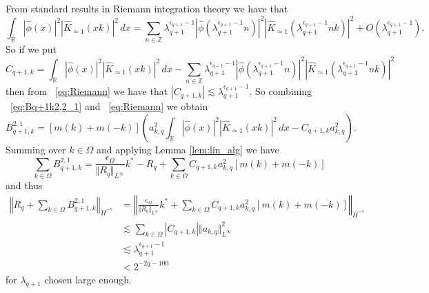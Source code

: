 \documentclass[12pt,reqno,letterpaper]{amsart}
\numberwithin{equation}{section}
\newcommand{\1}{{\bf 1}}
\newcommand{\2}{{\bf 2}}
\newcommand{\R}{\mathbb R}
\newcommand{\Z}{\mathbb Z}
\theoremstyle{remark}
\theoremstyle{remark}
\begin{document}
From standard results in Riemann integration theory we have that
\begin{equation}\label{eq:Riemann}
    \int_{\R} |\hat{\phi}(x)|^2 \left|\hat{K}_{\simeq 1}\left(xk\right)\right|^2\, dx = \sum_{n \in \Z} \lambda_{q+1}^{\epsilon_{q+1}-1} \left|\hat{\phi}\left(\lambda_{q+1}^{\epsilon_{q+1}-1}n\right)\right|^2 \left|\hat{K}_{\simeq 1}\left(\lambda_{q+1}^{\epsilon_{q+1}-1}nk\right)\right|^2 + O\left(\lambda_{q+1}^{\epsilon_{q+1}-1}\right).
\end{equation}
So if we put
$$
C_{q+1,k} = \int_{\R} |\hat{\phi}(x)|^2 \left|\hat{K}_{\simeq 1}\left(xk\right)\right|^2\, dx - \sum_{n \in \Z} \lambda_{q+1}^{\epsilon_{q+1}-1} \left|\hat{\phi}\left(\lambda_{q+1}^{\epsilon_{q+1}-1}n\right)\right|^2 \left|\hat{K}_{\simeq 1}\left(\lambda_{q+1}^{\epsilon_{q+1}-1}nk\right)\right|^2
$$
then from ~\eqref{eq:Riemann} we have that $|C_{q+1,k}| \lesssim \lambda_{q+1}^{\epsilon_{q+1}-1}$. So combining ~\eqref{eq:Bq+1k2,2_1} and ~\eqref{eq:Riemann} we obtain
\begin{equation*}
    B_{q+1,k}^{2,1} = \left[m(k) + m(-k)\right]\left(a_{k,q}^2 \int_{\R} \left|\hat{\phi}(x)\right|^2 \left|\hat{K}_{\simeq 1}(xk)\right|^2\, dx - C_{q+1,k} a_{k,q}^2\right).
\end{equation*}
Summing over $k \in \Omega$ and applying Lemma \ref{lem:lin_alg} we have
\begin{equation*}
    \sum_{k \in \Omega} B_{q+1,k}^{2,1} = \frac{\epsilon_\Omega}{\Vert R_q \Vert_{L^\infty}} k^* - R_q + \sum_{k \in \Omega} C_{q+1,k}a_{k,q}^2 \left[m(k) + m(-k)\right]
\end{equation*}
and thus
\begin{equation}\label{eq:Reynolds_cancel}
\begin{split}
    \left\Vert R_q + \sum_{k \in \Omega} B_{q+1,k}^{2,1} \right\Vert_{\dot{H}^{-s}} &= \left\Vert \frac{\epsilon_\Omega}{\Vert R_q \Vert_{L^\infty}}k^* + \sum_{k \in \Omega} C_{q+1,k} a_{k,q}^2 \left[m(k) + m(-k)\right]\right\Vert_{\dot{H}^{-s}}\\
    &\lesssim \sum_{k \in \Omega} |C_{q+1,k}| \Vert a_{k,q} \Vert_{L^\infty}^2\\
    &\lesssim \lambda_{q+1}^{\epsilon_{q+1}-1}\\
    &< 2^{-2q-100}
\end{split}
\end{equation}
for $\lambda_{q+1}$ chosen large enough. 
\end{document}
